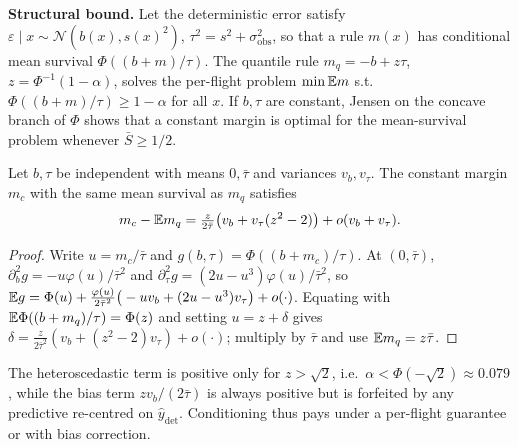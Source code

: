 \documentclass[10pt,twocolumn]{article}
\newcommand{\Norm}{\mathcal N}
\newcommand{\dt}{\hat y_{\mathrm{det}}}
\begin{document}
\textbf{Structural bound.} Let the deterministic error satisfy $\varepsilon\mid x\sim\Norm(b(x),s(x)^2)$, $\tau^2=s^2+\sigma_{\mathrm{obs}}^2$, so that a rule $m(x)$ has conditional mean survival $\Phi((b+m)/\tau)$. The quantile rule $m_q=-b+z\tau$, $z=\Phi^{-1}(1-\alpha)$, solves the per-flight problem $\min\mathbb{E} m$ s.t.\ $\Phi((b+m)/\tau)\ge1-\alpha$ for all $x$. If $b,\tau$ are constant, Jensen on the concave branch of $\Phi$ shows that a constant margin is optimal for the mean-survival problem whenever $\bar S\ge1/2$.
\begin{theorem}
Let $b,\tau$ be independent with means $0,\bar\tau$ and variances $v_b,v_\tau$. The constant margin $m_c$ with the same mean survival as $m_q$ satisfies
\[m_c-\mathbb{E} m_q=\tfrac{z}{2\bar\tau}\big(v_b+v_\tau(z^2-2)\big)+o(v_b+v_\tau).\]
\end{theorem}
\begin{proof}
Write $u=m_c/\bar\tau$ and $g(b,\tau)=\Phi((b+m_c)/\tau)$. At $(0,\bar\tau)$, $\partial_b^2g=-u\varphi(u)/\bar\tau^2$ and $\partial_\tau^2g=(2u-u^3)\varphi(u)/\bar\tau^2$, so $\mathbb{E} g=\Phi(u)+\frac{\varphi(u)}{2\bar\tau^2}\big(-uv_b+(2u-u^3)v_\tau\big)+o(\cdot)$. Equating with $\mathbb{E}\Phi((b+m_q)/\tau)=\Phi(z)$ and setting $u=z+\delta$ gives $\delta=\frac{z}{2\bar\tau^2}(v_b+(z^2-2)v_\tau)+o(\cdot)$; multiply by $\bar\tau$ and use $\mathbb{E} m_q=z\bar\tau$.
\end{proof}
The heteroscedastic term is positive only for $z>\sqrt2$, i.e.\ $\alpha<\Phi(-\sqrt2)\approx0.079$, while the bias term $zv_b/(2\bar\tau)$ is always positive but is forfeited by any predictive re-centred on $\dt$. Conditioning thus pays under a per-flight guarantee or with bias correction.
\end{document}
